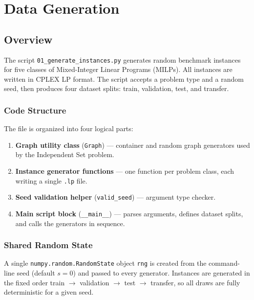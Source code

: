 \section{Data Generation}

\subsection{Overview}

The script \texttt{01\_generate\_instances.py} generates random benchmark instances for five classes of Mixed-Integer Linear Programs (MILPs). All instances are written in CPLEX LP format. The script accepts a problem type and a random seed, then produces four dataset splits: train, validation, test, and transfer.

\subsubsection{Code Structure}

The file is organized into four logical parts:

\begin{enumerate}
    \item \textbf{Graph utility class} (\texttt{Graph}) --- container and random graph generators used by the Independent Set problem.
    \item \textbf{Instance generator functions} --- one function per problem class, each writing a single \texttt{.lp} file.
    \item \textbf{Seed validation helper} (\texttt{valid\_seed}) --- argument type checker.
    \item \textbf{Main script block} (\texttt{\_\_main\_\_}) --- parses arguments, defines dataset splits, and calls the generators in sequence.
\end{enumerate}

\subsubsection{Shared Random State}

A single \texttt{numpy.random.RandomState} object \texttt{rng} is created from the command-line seed (default $s=0$) and passed to every generator. Instances are generated in the fixed order train $\to$ validation $\to$ test $\to$ transfer, so all draws are fully deterministic for a given seed.

